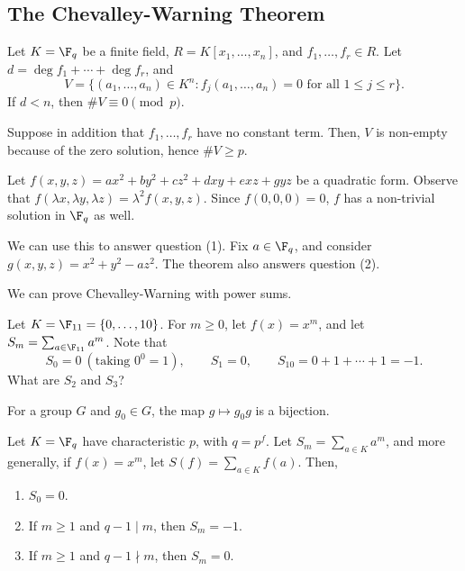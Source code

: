 \subsection{The Chevalley-Warning Theorem}

\begin{thm}
    Let $K = \F_q$ be a finite field, $R = K[x_1,\dots,x_n]$, and $f_1,\dots,f_r \in R$. Let $d = \deg f_1 + \cdots + \deg f_r$, and
    $$V = \{(a_1,\dots,a_n) \in K^n : f_j(a_1,\dots,a_n) = 0 \text{ for all } 1 \leq j \leq r\}.$$
    If $d < n$, then $\# V \equiv 0 \pmod p$.
\end{thm}

\begin{cor}
    Suppose in addition that $f_1,\dots,f_r$ have no constant term. Then, $V$ is non-empty because of the zero solution, hence $\# V \geq p$.
\end{cor}

\begin{cor}
    Let $f(x,y,z) = ax^2 + by^2 + cz^2 + dxy + exz + gyz$ be a quadratic form. Observe that $f(\lambda x, \lambda y, \lambda z) = \lambda^2 f(x,y,z)$. Since $f(0,0,0) = 0$, $f$ has a non-trivial solution in $\F_q$ as well.
\end{cor}

We can use this to answer question (1). Fix $a \in \F_q$, and consider $g(x,y,z) = x^2 + y^2 - az^2$. The theorem also answers question (2).

We can prove Chevalley-Warning with power sums.

\begin{ex}
    Let $K = \F_{11} = \{0,\dots,10\}$. For $m \geq 0$, let $f(x) = x^m$, and let $S_m = \sum_{a \in \F_{11}} a^m$. Note that
    $$S_0 = 0 \ (\text{taking } 0^0 = 1), \qquad S_1 = 0, \qquad S_{10} = 0 + 1 + \cdots + 1 = -1.$$
    What are $S_2$ and $S_3$?
\end{ex}

\begin{notebox*}[Observe]
    For a group $G$ and $g_0 \in G$, the map $g \mapsto g_0 g$ is a bijection.
\end{notebox*}

\begin{lem}[][label=lem:power-sums]
    Let $K = \F_q$ have characteristic $p$, with $q = p^f$. Let $S_m = \sum_{a \in K} a^m$, and more generally, if $f(x) = x^m$, let $S(f) = \sum_{a \in K} f(a)$. Then,
    \begin{enumerate}[(1)]
        \item $S_0 = 0$.
        \item If $m \geq 1$ and $q - 1 \mid m$, then $S_m = -1$.
        \item If $m \geq 1$ and $q - 1 \nmid m$, then $S_m = 0$.
    \end{enumerate}
\end{lem}

